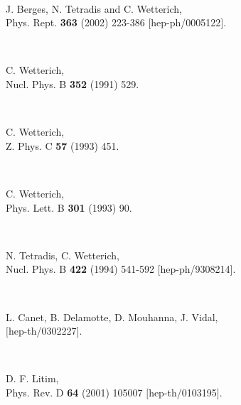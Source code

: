 \documentclass[a4paper,aps,prl,twocolumn,groupedaddress]{revtex4}
\begin{document}
\begin{thebibliography}{10}

~

J. Berges, N. Tetradis and C. Wetterich,\\
Phys. Rept. {\bf 363} (2002) 223-386 $[$hep-ph/0005122$]$.

~

C. Wetterich,\\
Nucl. Phys. B {\bf 352} (1991) 529.

~

C. Wetterich,\\
Z. Phys. C {\bf 57} (1993) 451.

~

C. Wetterich,\\
Phys. Lett. B {\bf 301} (1993) 90.

~

N. Tetradis, C. Wetterich,\\
Nucl. Phys. B {\bf 422} (1994) 541-592 $[$hep-ph/9308214$]$.

~

L. Canet, B. Delamotte, D. Mouhanna, J. Vidal,\\
$[$hep-th/0302227$]$.

~

D. F. Litim,\\
Phys. Rev. D {\bf 64} (2001) 105007 $[$hep-th/0103195$]$.

~

~

~


\end{thebibliography}
\end{document}

